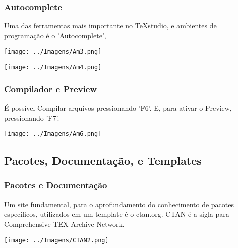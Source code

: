 \documentclass[9pt]{beamer}
\begin{document}
\begin{frame}

  \frametitle{Autocomplete}
  \begin{tcolorbox}[fontupper=\fontsize{5mm}{5mm}, size=small, sharp corners]
  Uma das ferramentas mais importante no TeXstudio, e ambientes de
  programação é o 'Autocomplete',
  \end{tcolorbox}

  \begin{center}
    \texttt{[image: ../Imagens/Am3.png]}
  \end{center}


  \begin{center}
    \texttt{[image: ../Imagens/Am4.png]}
  \end{center}


\end{frame}



\begin{frame}

  \frametitle{Compilador e Preview}
  \begin{tcolorbox}[fontupper=\fontsize{4mm}{4mm}, size=small, sharp corners]
  É possível Compilar arquivos pressionando 'F6'. E, para ativar o
  Preview, pressionando 'F7'.
  \end{tcolorbox}

  \begin{center}
    \texttt{[image: ../Imagens/Am6.png]}
  \end{center}


\end{frame}


\begin{frame}

  \section{Pacotes, Documentação, e Templates}
  \frametitle{Pacotes e Documentação}
  \begin{tcolorbox}[fontupper=\fontsize{4mm}{4mm}, size=small, sharp
    corners=downhill, colback=red!5!white,colframe=red!75!black]
  Um site fundamental, para o aprofundamento do conhecimento de
  pacotes específicos, utilizados em um
  template é o ctan.org. CTAN é a sigla para Comprehensive TEX Archive
  Network.
  \end{tcolorbox}
  \begin{center}
    \texttt{[image: ../Imagens/CTAN2.png]}
  \end{center}

\end{frame}
\end{document}
